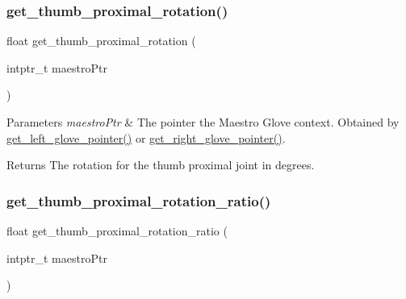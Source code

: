\subsubsection{\texorpdfstring{get\+\_\+thumb\+\_\+proximal\+\_\+rotation()}{get\_thumb\_proximal\_rotation()}}
{\footnotesize\ttfamily float get\+\_\+thumb\+\_\+proximal\+\_\+rotation (\begin{DoxyParamCaption}\item[{intptr\+\_\+t}]{maestro\+Ptr }\end{DoxyParamCaption})}


\begin{DoxyParams}{Parameters}
{\em maestro\+Ptr} & The pointer the Maestro Glove context. Obtained by \hyperlink{group__glove_management_ga63ce3c99d4a8b8db851b22af9185764e}{get\+\_\+left\+\_\+glove\+\_\+pointer()} or \hyperlink{group__glove_management_ga9b8fd9d91aeac3f8da50f7a7eba0c32b}{get\+\_\+right\+\_\+glove\+\_\+pointer()}. \\
\hline
\end{DoxyParams}
\begin{DoxyReturn}{Returns}
The rotation for the thumb proximal joint in degrees. 
\end{DoxyReturn}
\mbox{\label{group__rotation_access_ga6757e84fae5850e95bf380b534a1dd14}} 
\subsubsection{\texorpdfstring{get\+\_\+thumb\+\_\+proximal\+\_\+rotation\+\_\+ratio()}{get\_thumb\_proximal\_rotation\_ratio()}}
{\footnotesize\ttfamily float get\+\_\+thumb\+\_\+proximal\+\_\+rotation\+\_\+ratio (\begin{DoxyParamCaption}\item[{intptr\+\_\+t}]{maestro\+Ptr }\end{DoxyParamCaption})}


